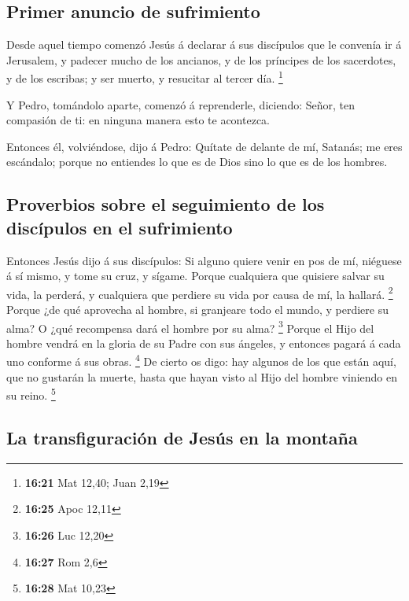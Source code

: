 \hypertarget{primer-anuncio-de-sufrimiento}{%
\subsection{Primer anuncio de
sufrimiento}\label{primer-anuncio-de-sufrimiento}}

 Desde aquel tiempo comenzó Jesús á declarar á sus
discípulos que le convenía ir á Jerusalem, y padecer mucho de los
ancianos, y de los príncipes de los sacerdotes, y de los escribas; y ser
muerto, y resucitar al tercer día. \footnote{\textbf{16:21} Mat 12,40;
  Juan 2,19}

 Y Pedro, tomándolo aparte, comenzó á reprenderle,
diciendo: Señor, ten compasión de ti: en ninguna manera esto te
acontezca.

 Entonces él, volviéndose, dijo á Pedro: Quítate de delante
de mí, Satanás; me eres escándalo; porque no entiendes lo que es de Dios
sino lo que es de los hombres.

\hypertarget{proverbios-sobre-el-seguimiento-de-los-discuxedpulos-en-el-sufrimiento}{%
\subsection{Proverbios sobre el seguimiento de los discípulos en el
sufrimiento}\label{proverbios-sobre-el-seguimiento-de-los-discuxedpulos-en-el-sufrimiento}}

 Entonces Jesús dijo á sus discípulos: Si alguno quiere
venir en pos de mí, niéguese á sí mismo, y tome su cruz, y sígame.
 Porque cualquiera que quisiere salvar su vida, la perderá,
y cualquiera que perdiere su vida por causa de mí, la hallará.
\footnote{\textbf{16:25} Apoc 12,11}  Porque ¿de qué
aprovecha al hombre, si granjeare todo el mundo, y perdiere su alma? O
¿qué recompensa dará el hombre por su alma? \footnote{\textbf{16:26} Luc
  12,20}  Porque el Hijo del hombre vendrá en la gloria de
su Padre con sus ángeles, y entonces pagará á cada uno conforme á sus
obras. \footnote{\textbf{16:27} Rom 2,6}  De cierto os
digo: hay algunos de los que están aquí, que no gustarán la muerte,
hasta que hayan visto al Hijo del hombre viniendo en su reino.
\footnote{\textbf{16:28} Mat 10,23}

\hypertarget{la-transfiguraciuxf3n-de-jesuxfas-en-la-montauxf1a}{%
\subsection{La transfiguración de Jesús en la
montaña}\label{la-transfiguraciuxf3n-de-jesuxfas-en-la-montauxf1a}}

